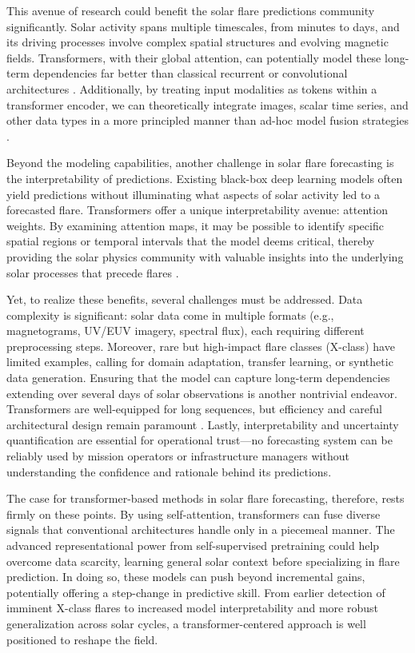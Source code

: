 This avenue of research could benefit the solar flare predictions community significantly. Solar activity spans multiple timescales, from minutes to days, and its driving processes involve complex spatial structures and evolving magnetic fields. Transformers, with their global attention, can potentially model these long-term dependencies far better than classical recurrent or convolutional architectures \citep{RefWorks:RefID:25-kaplanscaling}. Additionally, by treating input modalities as tokens within a transformer encoder, we can theoretically integrate images, scalar time series, and other data types in a more principled manner than ad-hoc model fusion strategies \citep{RefWorks:RefID:33-francisco2024multimodal}.

Beyond the modeling capabilities, another challenge in solar flare forecasting is the interpretability of predictions. Existing black-box deep learning models often yield predictions without illuminating what aspects of solar activity led to a forecasted flare. Transformers offer a unique interpretability avenue: attention weights. By examining attention maps, it may be possible to identify specific spatial regions or temporal intervals that the model deems critical, thereby providing the solar physics community with valuable insights into the underlying solar processes that precede flares \citep{RefWorks:RefID:34-gallagheri.}.

Yet, to realize these benefits, several challenges must be addressed. Data complexity is significant: solar data come in multiple formats (e.g., magnetograms, UV/EUV imagery, spectral flux), each requiring different preprocessing steps. Moreover, rare but high-impact flare classes (X-class) have limited examples, calling for domain adaptation, transfer learning, or synthetic data generation. Ensuring that the model can capture long-term dependencies extending over several days of solar observations is another nontrivial endeavor. Transformers are well-equipped for long sequences, but efficiency and careful architectural design remain paramount \citep{RefWorks:RefID:21-fedus2022switch}. Lastly, interpretability and uncertainty quantification are essential for operational trust—no forecasting system can be reliably used by mission operators or infrastructure managers without understanding the confidence and rationale behind its predictions.

The case for transformer-based methods in solar flare forecasting, therefore, rests firmly on these points. By using self-attention, transformers can fuse diverse signals that conventional architectures handle only in a piecemeal manner. The advanced representational power from self-supervised pretraining could help overcome data scarcity, learning general solar context before specializing in flare prediction. In doing so, these models can push beyond incremental gains, potentially offering a step-change in predictive skill. From earlier detection of imminent X-class flares to increased model interpretability and more robust generalization across solar cycles, a transformer-centered approach is well positioned to reshape the field.